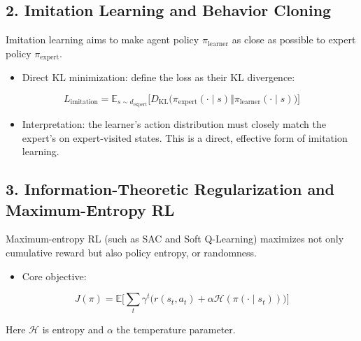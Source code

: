 \hypertarget{imitation-learning-and-behavior-cloning}{%
\subsection{2. Imitation Learning and Behavior Cloning}\label{imitation-learning-and-behavior-cloning}}

Imitation learning aims to make agent policy \(\pi_{\mathrm{learner}}\) as close as possible to expert policy \(\pi_{\mathrm{expert}}\).

\begin{itemize}
\tightlist
\item
{}
  Direct KL minimization: define the loss as their KL divergence:
\end{itemize}

\[
L_{\mathrm{imitation}}
=
\mathbb{E}_{s\sim d_{\mathrm{expert}}}
\bigl[
D_{\mathrm{KL}}\bigl(
\pi_{\mathrm{expert}}(\cdot\mid s)
\Vert
\pi_{\mathrm{learner}}(\cdot\mid s)
\bigr)
\bigr]
\]

\begin{itemize}
\tightlist
\item
  Interpretation: the learner's action distribution must closely match the expert's on expert-visited states. This is a direct, effective form of imitation learning.
\end{itemize}

\hypertarget{information-theoretic-regularization-and-maximum-entropy-rl}{%
\subsection{3. Information-Theoretic Regularization and Maximum-Entropy RL}\label{information-theoretic-regularization-and-maximum-entropy-rl}}

Maximum-entropy RL (such as SAC and Soft Q-Learning) maximizes not only cumulative reward but also policy entropy, or randomness.

\begin{itemize}
\tightlist
\item
{}
  Core objective:
\end{itemize}

\[
J(\pi)
=
\mathbb{E}
\bigl[
\sum_t \gamma^{t}
\bigl(
r(s_t,a_t)+\alpha\mathcal{H}(\pi(\cdot\mid s_t))
\bigr)
\bigr]
\]

Here \(\mathcal{H}\) is entropy and \(\alpha\) the temperature parameter.

